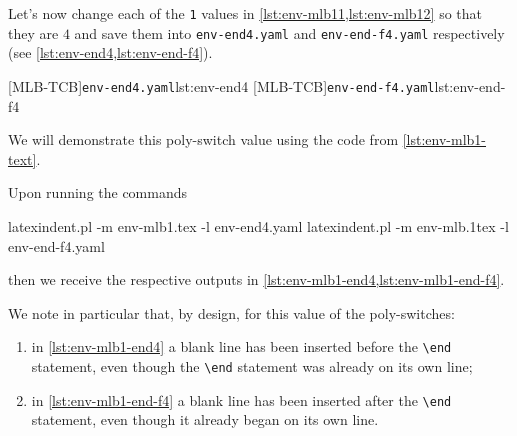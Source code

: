   \begin{example}
  Let's now change each of the \texttt{1} values in \cref{lst:env-mlb11,lst:env-mlb12} so
  that they are $4$ and save them into \texttt{env-end4.yaml} and \texttt{env-end-f4.yaml}
  respectively (see \cref{lst:env-end4,lst:env-end-f4}).

  \begin{cmhtcbraster}
   [MLB-TCB]{\texttt{env-end4.yaml}}{lst:env-end4}
   [MLB-TCB]{\texttt{env-end-f4.yaml}}{lst:env-end-f4}
  \end{cmhtcbraster}

  We will demonstrate this poly-switch value using the code from \vref{lst:env-mlb1-text}.

  Upon running the commands  

  \begin{commandshell}
latexindent.pl -m env-mlb1.tex -l env-end4.yaml
latexindent.pl -m env-mlb.1tex -l env-end-f4.yaml
\end{commandshell}

  then we receive the respective outputs in \cref{lst:env-mlb1-end4,lst:env-mlb1-end-f4}.

  \begin{cmhtcbraster}[raster column skip=.1\linewidth]
  \end{cmhtcbraster}

  We note in particular that, by design, for this value of the poly-switches:
  \begin{enumerate}
   \item in \cref{lst:env-mlb1-end4} a blank line has been inserted before the \lstinline!\end!
         statement, even though the \lstinline!\end! statement was already on its own line;
   \item in \cref{lst:env-mlb1-end-f4} a blank line has been inserted after the \lstinline!\end!
         statement, even though it already began on its own line.
  \end{enumerate}
  \end{example}

